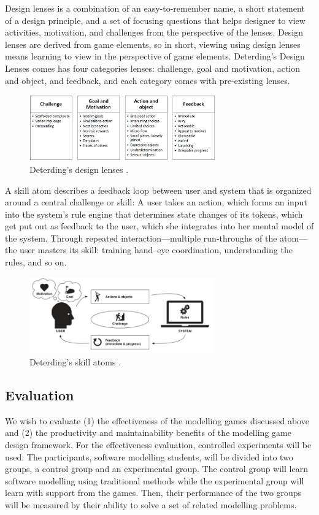 \documentclass[12pt, a4paper]{report}
\begin{document}
Design lenses is a combination of an easy-to-remember name, a short statement of a design principle, and a set of focusing questions that helps designer to view activities, motivation, and challenges from the perspective of the lenses. Design lenses are derived from game elements, so in short, viewing using design lenses means learning to view in the perspective of game elements. Deterding's Design Lenses comes has four categories lenses: challenge, goal and motivation, action and object, and feedback, and each category comes with pre-existing lenses.

\begin{figure}[ht]
\centering
\includegraphics[width=8cm]{lenses}
\caption{Deterding's design lenses \cite{deterding2015lens}.}
\label{fig:lenses}
\end{figure}


A skill atom describes a feedback loop between user and system that is organized around a central challenge or skill: A user takes an action, which forms an input into the system’s rule engine that determines state changes of its tokens, which get put out as feedback to the user, which she integrates into her mental model of the system. Through repeated interaction—multiple run-throughs of the atom—the user masters its skill: training hand–eye coordination, understanding the rules, and so on.

\begin{figure}[ht]
\centering
\includegraphics[width=8cm]{skill-atoms}
\caption{Deterding's skill atoms \cite{deterding2015lens}.}
\label{fig:skill-atoms}
\end{figure}

\subsection{Evaluation}
We wish to evaluate (1) the effectiveness of the modelling games discussed above and (2) the productivity and maintainability benefits of the modelling game design framework. For the effectiveness evaluation, controlled experiments will be used. The participants, software modelling students, will be divided into two groups, a control group and an experimental group. The control group will learn software modelling using traditional methods while the experimental group will learn with support from the games. Then, their performance of the two groups will be measured by their ability to solve a set of related modelling problems. 
\end{document}
